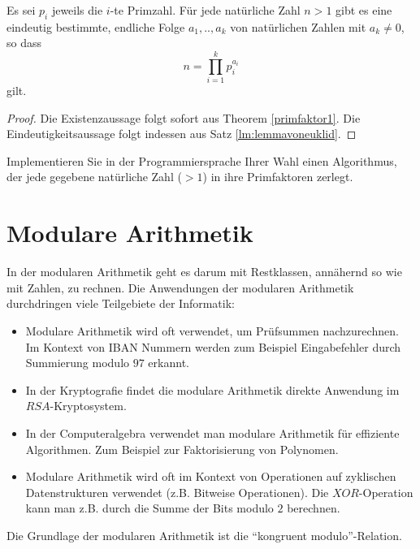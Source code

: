 \begin{thrm}[Primfaktorzerlegung]
Es sei $p_i$ jeweils die $i$-te Primzahl. Für jede natürliche Zahl $n>1$ gibt es eine eindeutig bestimmte, endliche Folge $a_1,..,a_k$ von natürlichen Zahlen mit $a_k\neq 0$, so dass
\[
 n=\prod_{i=1}^k p_i^{a_i}
\]
gilt.
\end{thrm}
\begin{proof}
 Die Existenzaussage folgt sofort aus Theorem \ref{primfaktor1}. Die Eindeutigkeitsaussage folgt indessen aus Satz \ref{lm:lemmavoneuklid}.
\end{proof}

\begin{ueb}
	Implementieren Sie in der Programmiersprache Ihrer Wahl einen Algorithmus, der jede gegebene natürliche Zahl ($>1$) in ihre Primfaktoren zerlegt.
\end{ueb}
\begin{lsg}
\end{lsg}

\section{Modulare Arithmetik}
In der modularen Arithmetik geht es darum mit Restklassen, annähernd so wie mit Zahlen, zu rechnen.
Die Anwendungen der modularen Arithmetik durchdringen viele Teilgebiete der Informatik:
\begin{itemize}
\item Modulare Arithmetik wird oft verwendet, um Prüfsummen nachzurechnen. Im Kontext von IBAN Nummern werden zum Beispiel Eingabefehler durch Summierung modulo $97$ erkannt.
\item In der Kryptografie findet die modulare Arithmetik direkte Anwendung im $RSA$-Kryptosystem.
\item In der Computeralgebra verwendet man modulare Arithmetik für effiziente Algorithmen. Zum Beispiel zur Faktorisierung von Polynomen.
\item Modulare Arithmetik wird oft im Kontext von Operationen auf zyklischen Datenstrukturen verwendet (z.B. Bitweise Operationen). Die $XOR$-Operation kann man z.B. durch die Summe der Bits modulo $2$ berechnen.
\end{itemize}




Die Grundlage der modularen Arithmetik ist die ``kongruent modulo''-Relation.



